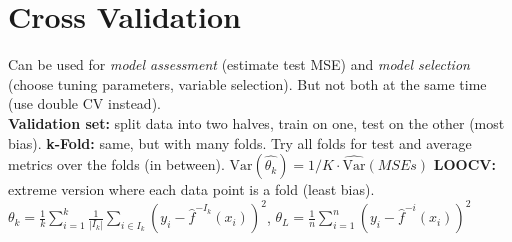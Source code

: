 \section*{Cross Validation}
Can be used for \textit{model assessment} (estimate test MSE) and \textit{model selection} (choose tuning parameters, variable selection). But not both at the same time (use double CV instead). \\
\textbf{Validation set:} split data into two halves, train on one, test on the other (most bias).
\textbf{k-Fold:} same, but with many folds. Try all folds for test and average metrics over the folds (in between). $\text{Var}(\hat {\theta_k}) = 1/K \cdot \hat {\text{Var}}(MSEs)$ \textbf{LOOCV:} extreme version where each data point is a fold (least bias). \\
$\theta_k = \frac 1 k \sum_{i=1}^k \frac 1 {|I_k|} \sum_{i\in I_k} (y_i - \hat f^{-I_k}(x_i))^2$, 
$\theta_{L} = \frac 1 n \sum_{i=1}^n (y_i - \hat f^{-i}(x_i))^2$